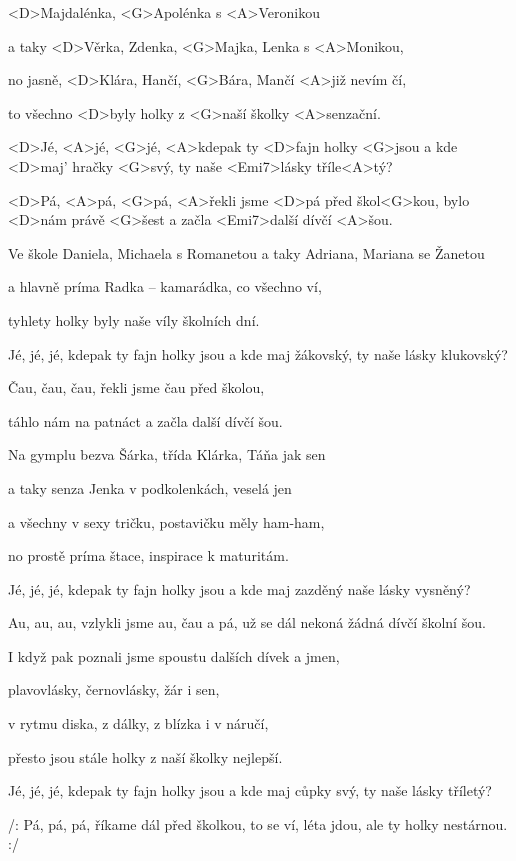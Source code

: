 

\zs
<D>Majdalénka, <G>Apolénka s <A>Veronikou

a taky <D>Věrka, Zdenka, <G>Majka, Lenka s <A>Monikou,

no jasně, <D>Klára, Hančí, <G>Bára, Mančí <A>již nevím čí,

to všechno <D>byly holky z <G>naší školky <A>senzační.
\ks

\zr
<D>Jé, <A>jé, <G>jé,
<A>kdepak ty <D>fajn holky <G>jsou
a kde <D>maj' hračky <G>svý,
ty naše <Emi7>lásky tříle<A>tý?

<D>Pá, <A>pá, <G>pá,
<A>řekli jsme <D>pá před škol<G>kou,
bylo <D>nám právě <G>šest
a začla <Emi7>další dívčí <A>šou.
\kr

\zs
Ve škole Daniela, Michaela s Romanetou
a taky Adriana, Mariana se Žanetou

a hlavně príma Radka -- kamarádka, co všechno ví,

tyhlety holky byly naše víly školních dní.
\ks

\zr
Jé, jé, jé,
kdepak ty fajn holky jsou
a kde maj žákovský,
ty naše lásky klukovský?

Čau, čau, čau,
řekli jsme čau před školou,

táhlo nám na patnáct
a začla další dívčí šou.
\kr

\zs
Na gymplu bezva Šárka, třída Klárka, Táňa jak sen

a taky senza Jenka v podkolenkách, veselá jen

a všechny v sexy tričku, postavičku měly ham-ham,

no prostě príma štace, inspirace k maturitám.
\ks

\zr
Jé, jé, jé,
kdepak ty fajn holky jsou
a kde maj zazděný
naše lásky vysněný?

Au, au, au,
vzlykli jsme au, čau a pá,
už se dál nekoná
žádná dívčí školní šou.
\kr

\zs
I když pak poznali jsme spoustu dalších dívek a jmen,

plavovlásky, černovlásky, žár i sen,

v rytmu diska, z dálky, z blízka i v náručí,

přesto jsou stále holky z naší školky nejlepší.
\ks

\zr
Jé, jé, jé,
kdepak ty fajn holky jsou
a kde maj cůpky svý,
ty naše lásky tříletý?

/: Pá, pá, pá,
říkame dál před školkou,
to se ví, léta jdou,
ale ty holky nestárnou. :/
\kr

\kp
